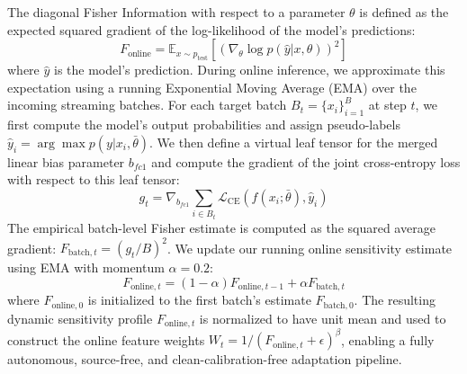 \documentclass{article}
\theoremstyle{plain}
\theoremstyle{definition}
\theoremstyle{remark}
\begin{document}
The diagonal Fisher Information with respect to a parameter $\theta$ is defined as the expected squared gradient of the log-likelihood of the model's predictions:
\begin{equation}
    F_{\text{online}} = \mathbb{E}_{x \sim p_{\text{test}}} \left[ \left( \nabla_{\theta} \log p(\hat{y} | x, \theta) \right)^2 \right]
\end{equation}
where $\hat{y}$ is the model's prediction. During online inference, we approximate this expectation using a running Exponential Moving Average (EMA) over the incoming streaming batches. For each target batch $B_t = \{x_i\}_{i=1}^B$ at step $t$, we first compute the model's output probabilities and assign pseudo-labels $\hat{y}_i = \arg\max p(y|x_i, \bar{\theta})$. We then define a virtual leaf tensor for the merged linear bias parameter $b_{fc1}$ and compute the gradient of the joint cross-entropy loss with respect to this leaf tensor:
\begin{equation}
    g_t = \nabla_{b_{fc1}} \sum_{i \in B_t} \mathcal{L}_{\text{CE}}(f(x_i; \bar{\theta}), \hat{y}_i)
\end{equation}
The empirical batch-level Fisher estimate is computed as the squared average gradient: $F_{\text{batch}, t} = (g_t / B)^2$. We update our running online sensitivity estimate using EMA with momentum $\alpha = 0.2$:
\begin{equation}
    F_{\text{online}, t} = (1 - \alpha) F_{\text{online}, t-1} + \alpha F_{\text{batch}, t}
\end{equation}
where $F_{\text{online}, 0}$ is initialized to the first batch's estimate $F_{\text{batch}, 0}$. The resulting dynamic sensitivity profile $F_{\text{online}, t}$ is normalized to have unit mean and used to construct the online feature weights $W_t = 1 / (F_{\text{online}, t} + \epsilon)^\beta$, enabling a fully autonomous, source-free, and clean-calibration-free adaptation pipeline.
\end{document}
